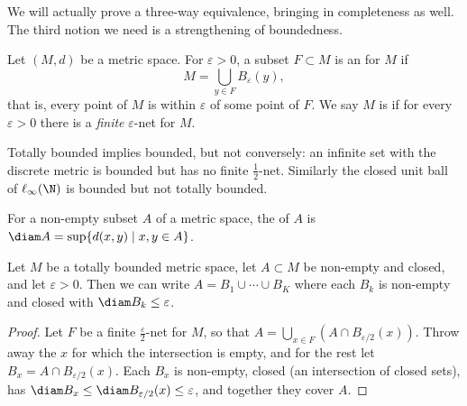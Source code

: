 We will actually prove a three-way equivalence, bringing in completeness as well. The third notion we need is a strengthening of boundedness.

\begin{definition}
    Let $(M, d)$ be a metric space. For $\varepsilon > 0$, a subset $F \subset M$ is an  for $M$ if
    $$
    M = \bigcup_{y \in F} B_{\varepsilon}(y),
    $$
    that is, every point of $M$ is within $\varepsilon$ of some point of $F$. We say $M$ is  if for every $\varepsilon > 0$ there is a \emph{finite} $\varepsilon$-net for $M$.
\end{definition}

Totally bounded implies bounded, but not conversely: an infinite set with the discrete metric is bounded but has no finite $\frac{1}{2}$-net. Similarly the closed unit ball of $\ell_\infty(\N)$ is bounded but not totally bounded.

\begin{definition}[Diameter]
    For a non-empty subset $A$ of a metric space, the  of $A$ is $\diam A = \sup\{d(x, y) \mid x, y \in A\}$.
\end{definition}

\begin{lemma}\label{lemma:chop}
    Let $M$ be a totally bounded metric space, let $A \subset M$ be non-empty and closed, and let $\varepsilon > 0$. Then we can write $A = B_1 \cup \cdots \cup B_K$ where each $B_k$ is non-empty and closed with $\diam B_k \leq \varepsilon$.
\end{lemma}
\begin{proof}
    Let $F$ be a finite $\frac{\varepsilon}{2}$-net for $M$, so that $A = \bigcup_{x \in F} (A \cap B_{\varepsilon/2}(x))$. Throw away the $x$ for which the intersection is empty, and for the rest let $B_x = A \cap B_{\varepsilon/2}(x)$. Each $B_x$ is non-empty, closed (an intersection of closed sets), has $\diam B_x \leq \diam B_{\varepsilon/2}(x) \leq \varepsilon$, and together they cover $A$.
\end{proof}

